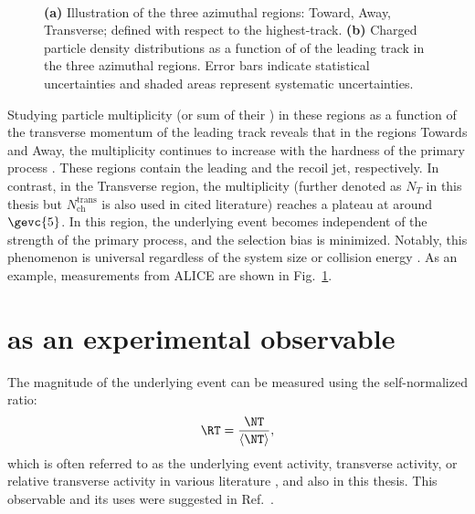 \begin{figure}%
\\
\caption{\textbf{(a)} Illustration of the three azimuthal regions: Toward, Away, Transverse; defined with respect to the highest-\pt track. \cite{acharyaUnderlyingEventProperties2020} \textbf{(b)} Charged particle density distributions as a function of \pt of the leading track in the three azimuthal regions. Error bars indicate statistical uncertainties and shaded areas represent systematic uncertainties. \cite{acharyaUnderlyingEventProperties2020} }
\label{fig:rt:rtdefi}
\end{figure}

Studying particle multiplicity (or sum of their \pt) in these regions as a function of the transverse momentum of the leading track \ptlead reveals that in the regions Towards and Away, the multiplicity continues to increase with the hardness of the primary process \cite{acharyaUnderlyingEventProperties2020, atlascollaborationMeasurementChargedparticleDistributions2017}. These regions contain the leading and the recoil jet, respectively. In contrast, in the Transverse region, the multiplicity (further denoted as $N_T$ in this thesis but $N_\mathrm{ch}^\mathrm{trans}$ is also used in cited literature) reaches a plateau at around $\gevc{5}$. In this region, the underlying event becomes independent of the strength of the primary process, and the selection bias is minimized. Notably, this phenomenon is universal regardless of the system size or collision energy \cite{atlascollaborationMeasurementChargedparticleDistributions2017, acharyaUnderlyingEventProperties2020, alicecollaborationUnderlyingEventMeasurements2012, alicecollaborationUnderlyingeventPropertiesPp2022}. As an example, measurements from ALICE are shown in Fig.~\ref{fig:rt:rtdefi}.

\section{\RT as an experimental observable}

The magnitude of the underlying event can be measured using the self-normalized ratio:
\begin{align}
\RT = \frac{\NT}{\langle \NT \rangle},
\end{align}
which is often referred to as the underlying event activity, transverse activity, or relative transverse activity in various literature \cite{martinProbingCollectiveEffects2016, alicecollaborationUnderlyingEventProperties2020, alicecollaborationProductionPionsKaons2023}, and also in this thesis. This observable and its uses were suggested in Ref.~\cite{martinProbingCollectiveEffects2016}.

